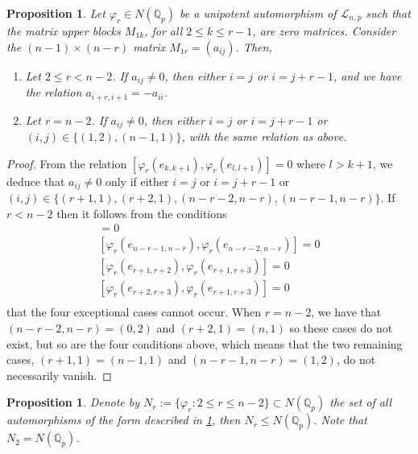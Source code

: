 \documentclass{article}
\newtheorem{proposition2}[theorem2]{Proposition}
\begin{document}
\begin{proposition2}
\label{block.1r.structure}
Let $\varphi_{r}\in{N(\mathbb{Q}_{p})}$ be a unipotent automorphism of $\mathcal{L}_{n,p}$ such that the matrix upper blocks $M_{1k}$, for all $2\leq{k}\leq{r-1}$, are zero matrices. Consider the $(n-1)\times{(n-r)}$ matrix $M_{1r}=(a_{ij})$. Then,
\begin{enumerate}
    \item Let $2\leq{r}<{n-2}$. If $a_{ij}\neq{0}$, then either $i=j$ or $i=j+r-1$, and we have the relation $a_{i+r,i+1}=-a_{ii}$.
    \item Let $r=n-2$. If $a_{ij}\neq{0}$, then either $i=j$ or $i=j+r-1$ or $(i,j)\in\{(1,2),(n-1,1)\}$, with the same relation as above.
\end{enumerate}
\end{proposition2}
\begin{proof}
From the relation $[\varphi_{r}(e_{k,k+1}),\varphi_{r}(e_{l,l+1})]=0$ where $l>k+1$, we deduce that $a_{ij}\neq{0}$ only if either $i=j$ or $i=j+r-1$ or\\ $(i,j)\in\{(r+1,1),(r+2,1),(n-r-2,n-r),(n-r-1,n-r)\}$. If $r<n-2$ then it follows from the conditions
\begin{align*}
[\varphi_{r}(e_{n-r-2,n-r-1}),\varphi_{r}(e_{n-r-2,n-r})]=0\\
[\varphi_{r}(e_{n-r-1,n-r}),\varphi_{r}(e_{n-r-2,n-r})]=0\\
[\varphi_{r}(e_{r+1,r+2}),\varphi_{r}(e_{r+1,r+3})]=0\\
[\varphi_{r}(e_{r+2,r+3}),\varphi_{r}(e_{r+1,r+3})]=0\\
\end{align*}
that the four exceptional cases cannot occur. When $r=n-2$, we have that $(n-r-2,n-r)=(0,2)$ and $(r+2,1)=(n,1)$ so these cases do not exist, but so are the four conditions above, which means that the two remaining cases, $(r+1,1)=(n-1,1)$ and $(n-r-1,n-r)=(1,2)$, do not necessarily vanish.
\end{proof}
\begin{proposition2}
Denote by $N_{r}:=\{\varphi_{r} : 2\leq{r}\leq{n-2}\}\subset{N(\mathbb{Q}_{p})}$ the set of all automorphisms of the form described in \ref{block.1r.structure}, then $N_{r}\leq{N(\mathbb{Q}_{p})}$. Note that $N_2=N(\mathbb{Q}_{p})$.
\end{proposition2}
\end{document}
